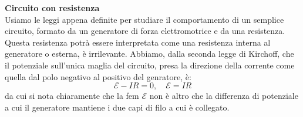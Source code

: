 \documentclass[a4paper,12pt]{article}
\begin{document}
\par\smallskip
\textbf{Circuito con resistenza} \\
Usiamo le leggi appena definite per studiare il comportamento di un semplice circuito, formato da un generatore di forza elettromotrice e da una resistenza.
Questa resistenza potrà essere interpretata come una resistenza interna al generatore o esterna, è irrilevante. Abbiamo, dalla seconda legge di Kirchoff, che
il potenziale sull'unica maglia del circuito, presa la direzione della corrente come quella dal polo negativo al positivo del genratore, è:
$$ \mathcal{E} - IR = 0 , \quad \mathcal{E} = IR $$
da cui si nota chiaramente che la fem $\mathcal{E}$ non è altro che la differenza di potenziale a cui il generatore mantiene
i due capi di filo a cui è collegato.
\end{document}
